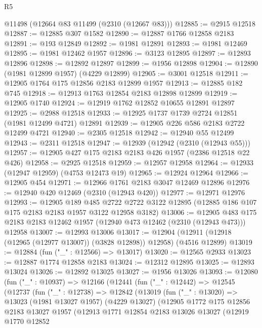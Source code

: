 \begin{lexlean}{R5}
\begin{coremodule}
    @11498
    (@12664 @83 @11499 (@2310 (@12667 @83)))
@12885 := @2915 @12518
@12887 := @12885 @307 @1582
@12890 := @12887 @1766 @12858 @2183
@12891 := @193 @12849
@12892 := @1981 @12891
@12893 := @1981 @12469
@12895 := @1981 @12462 @1957
@12896 := @3123 @12895
@12897 := @12893 @12896
@12898 := @12892 @12897
@12899 := @1956 @12898
@12904 := @12890 (@1981 @12899 @1957) (@4229 @12899)
@12905 := @3001 @12518
@12911 := @12905 @1764 @175 @12856 @2183 @12899 @1957
@12913 := @12885 @182 @745
@12918 := @12913 @1763 @12854 @2183 @12898 @12899
@12919 := @12905 @1740
@12924 := @12919 @1762 @12852 @10655 @12891 @12897
@12925 := @2988 @12518
@12933 := @12925 @1737 @1739 @2724 @12851 (@1981 @12499 @4721) @12891
@12939 := @12905 @226 @586 @2183 @2722 @12499 @4721
@12940 := @2305 @12518
@12942 := @12940 @55 @12499
@12943 := @2311 @12518
@12947 := @12939 (@12942 (@2310 (@12943 @55)))
@12957 := @12905 @427 @175 @2183 @2183 @426 @1957 (@2386 @12518 @22 @426)
@12958 := @2925 @12518
@12959 := @12957 @12958
@12964 := @12933 (@12947 @12959) (@4753 @12473 @19)
@12965 := @12924 @12964
@12966 := @12905 @454
@12971 := @12966 @1761 @2183 @3047 @12469 @12896
@12976 := @12940 @420 @12469 (@2310 (@12943 @420))
@12977 := @12971 @12976
@12993 := @12905
    @189
    @485
    @2722
    @2722
    @3122
    @12895
    (@12885 @186 @107 @175 @2183 @2183 @1957 @3122 @12958 @3182)
@13006 := @12905
    @483
    @175
    @2183
    @2183
    @12462
    @1957
    (@12940 @473 @12462 (@2310 (@12943 @473)))
    @12958
@13007 := @12993 @13006
@13017 := @12904 (@12911 (@12918 (@12965 (@12977 @13007)) (@3828 @12898)) @12958) (@4516 @12899)
@13019 := @12884 (fun ("_" : @12566) => @13017)
@13020 := @12565 @2933
@13023 := @12887 @1774 @12858 @2183
@13024 := @12312 @12895
@13025 := @12893 @13024
@13026 := @12892 @13025
@13027 := @1956 @13026
@13093 := @12080
    (fun ("_" : @10937) =>
    @12166
      (@12441
        (fun ("_" : @12442) =>
        @12545
          (@12737
            (fun ("_" : @12738) =>
            @12842
              (@13019
                (fun ("_" : @13020) =>
                @13023
                  (@1981 @13027 @1957)
                  (@4229 @13027)
                  (@12905
                    @1772
                    @175
                    @12856
                    @2183
                    @13027
                    @1957
                    (@12913
                      @1771
                      @12854
                      @2183
                      @13026
                      @13027
                      (@12919
                        @1770
                        @12852

\end{coremodule}
\end{lexlean}
